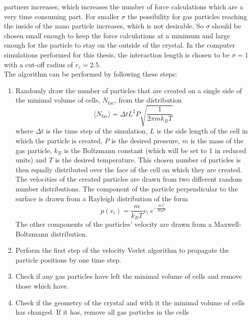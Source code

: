 \documentclass[12pt]{article}
\begin{document}
partners increases, which increases the number of force calculations which are a very time consuming part. For smaller $\sigma$ the possibility for
gas particles reaching the inside of the nano particle increases, which is not desirable. So $\sigma$ should be chosen small enough to keep the force
calculations at a minimum and large enough for the particle to stay on the outside of the crystal. In the computer simulations performed for this
thesis, the interaction length is chosen to be $\sigma = 1$ with a cut-off radius of $r_c = 2.5$.\\ 
The algorithm can be performed by following these steps:
\begin{enumerate}
    \item Randomly draw the number of particles that are created on a single side of the minimal volume of cells, $N_\text{fac}$, from the
        distribution 
        \begin{equation}
            \langle N_\text{fac}\rangle = \Delta t L^2 P \sqrt{\frac{1}{2\pi m k_B T}}
        \end{equation}
        where $\Delta t$ is the time step of the simulation, $L$ is the side length of the cell in which the particle is created, $P$ is the desired
        pressure, $m$ is the mass of the gas particle, $k_B$ is the Boltzmann constant (which will be set to 1 in reduced units) and $T$ is the
        desired temperature. This chosen number of particles is then equally distributed over the face of the cell on which they are created. The
        velocities of the created particles are drawn from two different random number distributions. The component of the particle perpendicular to
        the surface is drawn from a Rayleigh distribution of the form 
        \begin{equation}
            p(v_i) = \frac{m}{k_B T}v_i \ e^{-\frac{mv_i^2}{2k_BT}}
        \end{equation}
        The other components of the particles' velocity are drawn from a Maxwell-Boltzmann distribution.
    \item Perform the first step of the velocity Verlet algorithm to propagate the particle positions by one time step.
    \item Check if any gas particles have left the minimal volume of cells and remove those which have.
    \item Check if the geometry of the crystal and with it the minimal volume of cells has changed. If it has, remove all gas particles in the cells

\end{enumerate}
\end{document}
